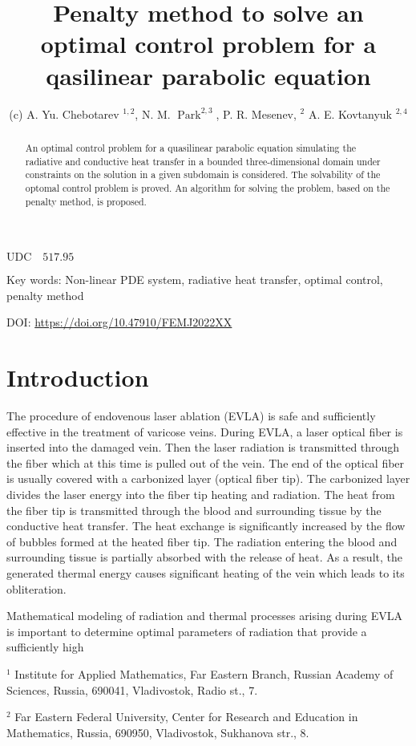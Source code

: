 \documentclass[10pt]{article}
\title{Penalty method to solve an optimal control problem for a qasilinear parabolic equation }
\author{(c) A. Yu. Chebotarev ${ }^{1,2}$, N. M. $\operatorname{Park}^{2,3}$, P. R. Mesenev, ${ }^{2}$ A. E. Kovtanyuk ${ }^{2,4}$}
\date{}
\begin{document}
\maketitle
$\mathrm{UDC} \quad 517.95$


\begin{abstract}
An optimal control problem for a quasilinear parabolic equation simulating the radiative and conductive heat transfer in a bounded three-dimensional domain under constraints on the solution in a given subdomain is considered. The solvability of the optomal control problem is proved. An algorithm for solving the problem, based on the penalty method, is proposed.
\end{abstract}

Key words: Non-linear PDE system, radiative heat transfer, optimal control, penalty method

DOI: \href{https://doi.org/10.47910/FEMJ2022XX}{https://doi.org/10.47910/FEMJ2022XX}

\section{Introduction}
The procedure of endovenous laser ablation (EVLA) is safe and sufficiently effective in the treatment of varicose veins. During EVLA, a laser optical fiber is inserted into the damaged vein. Then the laser radiation is transmitted through the fiber which at this time is pulled out of the vein. The end of the optical fiber is usually covered with a carbonized layer (optical fiber tip). The carbonized layer divides the laser energy into the fiber tip heating and radiation. The heat from the fiber tip is transmitted through the blood and surrounding tissue by the conductive heat transfer. The heat exchange is significantly increased by the flow of bubbles formed at the heated fiber tip. The radiation entering the blood and surrounding tissue is partially absorbed with the release of heat. As a result, the generated thermal energy causes significant heating of the vein which leads to its obliteration.

Mathematical modeling of radiation and thermal processes arising during EVLA is important to determine optimal parameters of radiation that provide a sufficiently high

${ }^{1}$ Institute for Applied Mathematics, Far Eastern Branch, Russian Academy of Sciences, Russia, 690041, Vladivostok, Radio st., 7.

${ }^{2}$ Far Eastern Federal University, Center for Research and Education in Mathematics, Russia, 690950, Vladivostok, Sukhanova str., 8.
\end{document}

